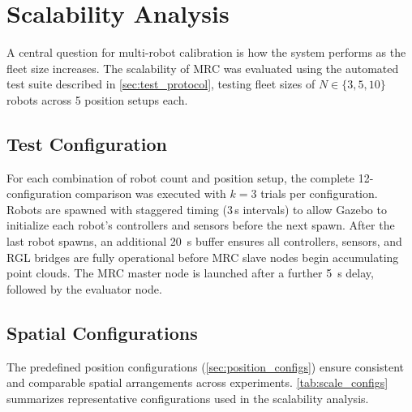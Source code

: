 \section{Scalability Analysis}
\label{sec:scalability}

A central question for multi-robot calibration is how the system
performs as the fleet size increases.
The scalability of MRC was evaluated using the automated test suite
described in \autoref{sec:test_protocol}, testing fleet sizes of
$N \in \{3, 5, 10\}$ robots across 5 position setups each.

\subsection{Test Configuration}

For each combination of robot count and position setup, the complete
12-configuration comparison was executed with $k = 3$ trials per
configuration.
Robots are spawned with staggered timing (3\,s intervals) to allow
Gazebo to initialize each robot's controllers and sensors before
the next spawn.
After the last robot spawns, an additional \SI{20}{\second} buffer
ensures all controllers, sensors, and RGL bridges are fully
operational before MRC slave nodes begin accumulating point clouds.
The MRC master node is launched after a further \SI{5}{\second} delay,
followed by the evaluator node.

\subsection{Spatial Configurations}

The predefined position configurations
(\autoref{sec:position_configs}) ensure consistent and comparable
spatial arrangements across experiments.
\autoref{tab:scale_configs} summarizes representative configurations
used in the scalability analysis.

